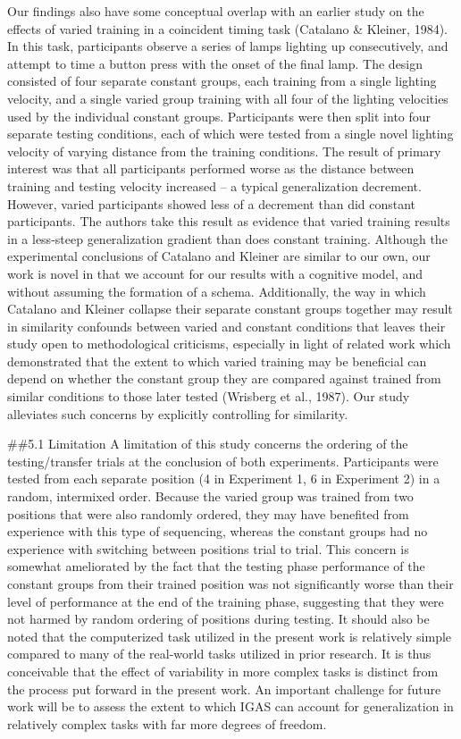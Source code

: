 \documentclass[
  jou, donotrepeattitle,floatsintext]{apa7}
\begin{document}
Our findings also have some conceptual overlap with an earlier study on the effects of varied training in a coincident timing task (Catalano \& Kleiner, 1984). In this task, participants observe a series of lamps lighting up consecutively, and attempt to time a button press with the onset of the final lamp. The design consisted of four separate constant groups, each training from a single lighting velocity, and a single varied group training with all four of the lighting velocities used by the individual constant groups. Participants were then split into four separate testing conditions, each of which were tested from a single novel lighting velocity of varying distance from the training conditions. The result of primary interest was that all participants performed worse as the distance between training and testing velocity increased -- a typical generalization decrement. However, varied participants showed less of a decrement than did constant participants. The authors take this result as evidence that varied training results in a less-steep generalization gradient than does constant training. Although the experimental conclusions of Catalano and Kleiner are similar to our own, our work is novel in that we account for our results with a cognitive model, and without assuming the formation of a schema. Additionally, the way in which Catalano and Kleiner collapse their separate constant groups together may result in similarity confounds between varied and constant conditions that leaves their study open to methodological criticisms, especially in light of related work which demonstrated that the extent to which varied training may be beneficial can depend on whether the constant group they are compared against trained from similar conditions to those later tested (Wrisberg et al., 1987). Our study alleviates such concerns by explicitly controlling for similarity.

\#\#5.1 Limitation
A limitation of this study concerns the ordering of the testing/transfer trials at the conclusion of both experiments. Participants were tested from each separate position (4 in Experiment 1, 6 in Experiment 2) in a random, intermixed order. Because the varied group was trained from two positions that were also randomly ordered, they may have benefited from experience with this type of sequencing, whereas the constant groups had no experience with switching between positions trial to trial. This concern is somewhat ameliorated by the fact that the testing phase performance of the constant groups from their trained position was not significantly worse than their level of performance at the end of the training phase, suggesting that they were not harmed by random ordering of positions during testing. It should also be noted that the computerized task utilized in the present work is relatively simple compared to many of the real-world tasks utilized in prior research. It is thus conceivable that the effect of variability in more complex tasks is distinct from the process put forward in the present work. An important challenge for future work will be to assess the extent to which IGAS can account for generalization in relatively complex tasks with far more degrees of freedom.
\end{document}
